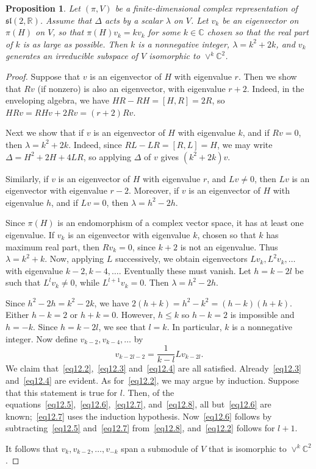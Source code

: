 \documentclass[12pt,reqno]{book}%
\newtheorem{proposition}{Proposition}[chapter]
\theoremstyle{definition}
\theoremstyle{remark}
\theoremstyle{theorem}
\theoremstyle{remark}
\begin{document}
\begin{proposition}\label{prop12.3}%
    Let $(\pi, V)$ be a finite-dimensional complex representation of $\mathfrak{sl}(2, \mathbb{R})$.
    Assume that $\Delta$ acts by a scalar $\lambda$ on $V$.
    Let $v_k$ be an eigenvector on $\pi(H)$ on $V$, so that $\pi(H)v_k = kv_k$ for some $k \in \mathbb{C}$ chosen so that the real part of $k$ is as large as possible.
    Then $k$ is a nonnegative integer, $\lambda = k^2 + 2k$, and $v_k$ generates an irreducible subspace of $V$ isomorphic to $\vee^k\mathbb{C}^2$.
\end{proposition}%
\begin{proof}%
    Suppose that $v$ is an eigenvector of $H$ with eigenvalue $r$.
    Then we show that $Rv$ (if nonzero) is also an eigenvector, with eigenvalue $r + 2$.
    Indeed, in the enveloping algebra, we have $HR - RH = [H, R] = 2R$, so $HRv = RHv + 2Rv = (r +  2)Rv$.

    Next we show that if $v$ is an eigenvector of $H$ with eigenvalue $k$, and if $Rv = 0$, then $\lambda = k^2 + 2k$.
    Indeed, since $RL - LR = [R, L] = H$, we may write $\Delta = H^2 + 2H + 4LR$, so applying $\Delta$ of $v$ gives $(k^2 + 2k)v$.

    Similarly, if $v$ is an eigenvector of $H$ with eigenvalue $r$, and $Lv \neq 0$, then $Lv$ is an eigenvector with eigenvalue $r - 2$.
    Moreover, if $v$ is an eigenvector of $H$ with eigenvalue $h$, and if $Lv = 0$, then $\lambda = h^2 - 2h$.

    Since $\pi(H)$ is an endomorphism of a complex vector space, it has at least one eigenvalue.
    If $v_k$ is an eigenvector with eigenvalue $k$, chosen so that $k$ has maximum real part, then $Rv_k = 0$, since $k + 2$ is not an eigenvalue.
    Thus $\lambda = k^2 + k$.
    Now, applying $L$ successively, we obtain eigenvectors $Lv_k, L^2v_k, \ldots$ with eigenvalue $k - 2, k - 4, \ldots$.
    Eventually these must vanish.
    Let $h = k - 2l$ be such that $L^lv_k \neq 0$, while $L^{l + 1}v_k = 0$.
    Then $\lambda = h^2 - 2h$.

    Since $h^2 - 2h = k^2 - 2k$, we have $2(h + k) = h^2 - k^2 = (h - k)(h + k)$.
    Either $h - k = 2$ or $h + k = 0$.
    However, $h \leq k$ so $h - k = 2$ is impossible and $h = -k$.
    Since $h = k - 2l$, we see that $l = k$.
    In particular, $k$ is a nonnegative integer.
    Now define $v_{k - 2}, v_{k - 4}, \ldots$ by
    \[
        v_{k - 2l - 2} = \frac{1}{k - l}Lv_{k - 2l}.
    \]
    We claim that~\eqref{eq12.2},~\eqref{eq12.3} and~\eqref{eq12.4} are all satisfied.
    Already~\eqref{eq12.3} and~\eqref{eq12.4} are evident.
    As for~\eqref{eq12.2}, we may argue by induction.
    Suppose that this statement is true for $l$.
    Then, of the equations~\eqref{eq12.5},~\eqref{eq12.6},~\eqref{eq12.7}, and~\eqref{eq12.8}, all but~\eqref{eq12.6} are known;~\eqref{eq12.7} uses the induction hypothesis.
    Now~\eqref{eq12.6} follows by subtracting~\eqref{eq12.5} and~\eqref{eq12.7} from~\eqref{eq12.8}, and~\eqref{eq12.2} follows for $l + 1$.

    It follows that $v_k, v_{k - 2}, \ldots, v_{-k}$ span a submodule of $V$ that is isomorphic to $\vee^k\mathbb{C}^2$.
\end{proof}%



\vspace{10em}
\end{document}

